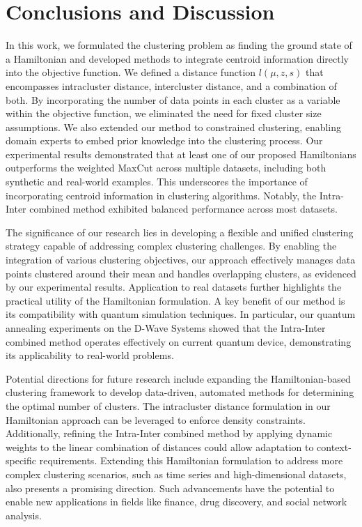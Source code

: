\documentclass[showpacs,twocolumn,superscriptaddress]{revtex4-2}
\begin{document}
\section{Conclusions and Discussion}
In this work, we formulated the clustering problem as finding the ground state of a Hamiltonian and developed methods to integrate centroid information directly into the objective function. We defined a distance function $l(\mu,z,s)$ that encompasses intracluster distance, intercluster distance, and a combination of both. By incorporating the number of data points in each cluster as a variable within the objective function, we eliminated the need for fixed cluster size assumptions. We also extended our method to constrained clustering, enabling domain experts to embed prior knowledge into the clustering process. Our experimental results demonstrated that at least one of our proposed Hamiltonians outperforms the weighted MaxCut across multiple datasets, including both synthetic and real-world examples. This underscores the importance of incorporating centroid information in clustering algorithms. Notably, the Intra-Inter combined method exhibited balanced performance across most datasets.

The significance of our research lies in developing a flexible and unified clustering strategy capable of addressing complex clustering challenges. By enabling the integration of various clustering objectives, our approach effectively manages data points clustered around their mean and handles overlapping clusters, as evidenced by our experimental results. Application to real datasets further highlights the practical utility of the Hamiltonian formulation. A key benefit of our method is its compatibility with quantum simulation techniques. In particular, our quantum annealing experiments on the D-Wave Systems showed that the Intra-Inter combined method operates effectively on current quantum device, demonstrating its applicability to real-world problems. 

Potential directions for future research include expanding the Hamiltonian-based clustering framework to develop data-driven, automated methods for determining the optimal number of clusters. The intracluster distance formulation in our Hamiltonian approach can be leveraged to enforce density constraints. Additionally, refining the Intra-Inter combined method by applying dynamic weights to the linear combination of distances could allow adaptation to context-specific requirements. Extending this Hamiltonian formulation to address more complex clustering scenarios, such as time series and high-dimensional datasets, also presents a promising direction. Such advancements have the potential to enable new applications in fields like finance, drug discovery, and social network analysis.
\end{document}
